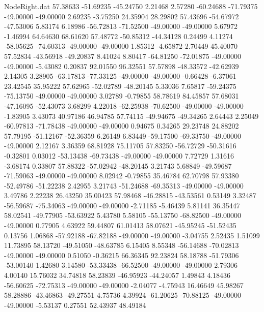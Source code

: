 \begin{filecontents}{NodeRight.dat}
  57.38633  -51.69235  -45.24750     2.21468    2.57280  -60.24688  -71.79375  -49.00000  -49.00000    2.69235   -3.75250   24.35904   28.29802
  57.43696  -54.67972  -47.53006     5.83174    6.18986  -56.72813  -71.52500  -49.00000  -49.00000    5.67972   -1.46994   64.64630   68.61620
  57.48772  -50.85312  -44.34128     0.24499    4.11274  -58.05625  -74.60313  -49.00000  -49.00000    1.85312   -4.65872    2.70449   45.40070
  57.52834  -43.56918  -49.20837     8.41024    8.80417  -64.81250  -72.01875  -49.00000  -49.00000   -5.43082    0.20837   92.01550   96.32551
  57.57898  -48.33572  -42.62939     2.14305    3.28905  -63.17813  -77.33125  -49.00000  -49.00000   -0.66428   -6.37061   23.42545   35.95222
  57.62965  -52.02789  -48.20145     5.33036    7.65817  -59.24375  -75.13750  -49.00000  -49.00000    3.02789   -0.79855   58.78619   84.45857
  57.68031  -47.16095  -52.43073     3.68299    4.22018  -62.25938  -70.62500  -49.00000  -49.00000   -1.83905    3.43073   40.97186   46.94785
  57.74115  -49.94675  -49.34265     2.64443    2.25049  -60.97813  -71.78438  -49.00000  -49.00000    0.94675    0.34265   29.23748   24.88202
  57.79195  -51.12167  -52.36359     6.26149    6.83449  -59.17500  -69.33750  -49.00000  -49.00000    2.12167    3.36359   68.81928   75.11705
  57.83250  -56.72729  -50.31616    -0.32801    0.03012  -53.13438  -69.73438  -49.00000  -49.00000    7.72729    1.31616   -3.68174    0.33807
  57.88322  -57.02942  -48.20145     3.21743    5.68849  -49.59687  -71.59063  -49.00000  -49.00000    8.02942   -0.79855   35.46784   62.70798
  57.93380  -52.49786  -51.22238     2.42955    3.21743  -51.24688  -69.35313  -49.00000  -49.00000    3.49786    2.22238   26.43250   35.00423
  57.98468  -46.28815  -43.53561     0.53149    3.32487  -56.59687  -75.34063  -49.00000  -49.00000   -2.71185   -5.46439    5.81141   36.35447
  58.02541  -49.77905  -53.63922     5.43780    5.58105  -55.13750  -68.82500  -49.00000  -49.00000    0.77905    4.63922   59.44807   61.01413
  58.07621  -45.95245  -51.52435     0.13756    1.06868  -57.92188  -67.82188  -49.00000  -49.00000   -3.04755    2.52435    1.51099   11.73895
  58.13720  -49.51050  -48.63785     6.15405    8.55348  -56.14688  -70.02813  -49.00000  -49.00000    0.51050   -0.36215   66.36345   92.23824
  58.18788  -51.79306  -53.00140     1.42680    3.14580  -53.33438  -66.52500  -49.00000  -49.00000    2.79306    4.00140   15.76032   34.74818
  58.23839  -46.95923  -44.24057     1.49843    4.18436  -56.60625  -72.75313  -49.00000  -49.00000   -2.04077   -4.75943   16.46649   45.98267
  58.28886  -43.46863  -49.27551     4.75736    4.39924  -61.20625  -70.88125  -49.00000  -49.00000   -5.53137    0.27551   52.43937   48.49184

\end{filecontents}
